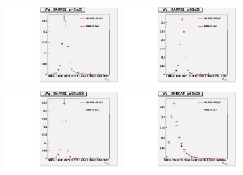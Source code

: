 \begin{figure}[htb]
  \begin{center}
  \includegraphics[width=0.45\textwidth]{../figs/figs_v11/ChannelsMERGED_WGamma/QuickChecks/cTemplatesVsWMt_Wg_phoSigmaIEtaIEta_BARREL_pt15to20.pdf} \includegraphics[width=0.45\textwidth]{../figs/figs_v11/ChannelsMERGED_WGamma/QuickChecks/cTemplatesVsWMt_Wg_phoSigmaIEtaIEta_BARREL_pt20to35.pdf} \\
  \includegraphics[width=0.45\textwidth]{../figs/figs_v11/ChannelsMERGED_WGamma/QuickChecks/cTemplatesVsWMt_Wg_phoSigmaIEtaIEta_BARREL_pt35to500.pdf}  \includegraphics[width=0.45\textwidth]{../figs/figs_v11/ChannelsMERGED_WGamma/QuickChecks/cTemplatesVsWMt_Wg_phoSigmaIEtaIEta_ENDCAP_pt15to20.pdf} \\

\end{center}
\end{figure}
